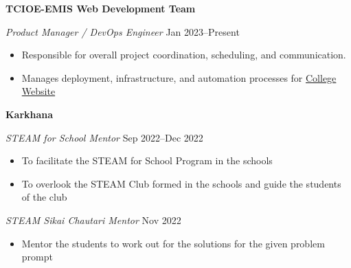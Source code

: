 \textbf{TCIOE-EMIS Web Development Team \hfill }\par

\textit{Product Manager / DevOps Engineer} \hfill Jan 2023--Present
\begin{itemize}
	\item Responsible for overall project coordination, scheduling, and communication.
        \item Manages deployment, infrastructure, and automation processes for  \href{https://www.tcioe.edu.np}{College Website}
\end{itemize}\par

\textbf{Karkhana \hfill }\par
\textit{STEAM for School Mentor} \hfill Sep 2022--Dec 2022
\begin{itemize}
	\item To facilitate the STEAM for School Program in the schools
	\item To overlook the STEAM Club formed in the schools and guide the students of the club
\end{itemize}\par

\textit{STEAM Sikai Chautari Mentor} \hfill Nov 2022
\begin{itemize}
	\item Mentor the students to work out for the solutions for the given problem prompt
\end{itemize}\par